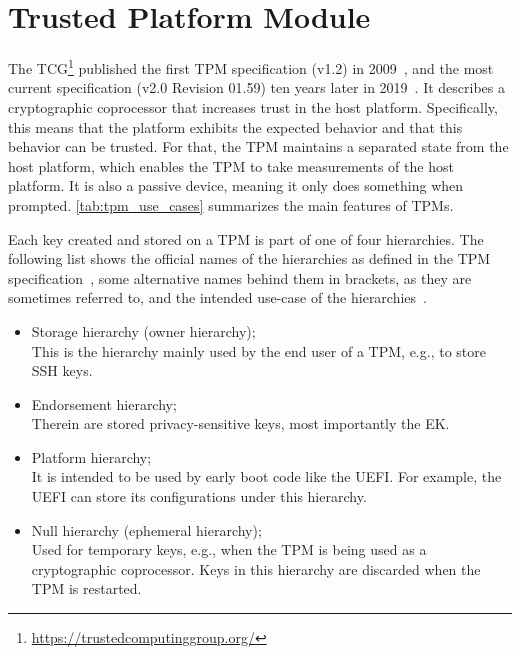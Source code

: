 \section{Trusted Platform Module}\label{sec:tpm}

The \ac{TCG}\footnote{\url{https://trustedcomputinggroup.org/}} published the first TPM specification (v1.2) in 2009~\cite{ISO11889}, and the most current specification (v2.0 Revision 01.59) ten years later in 2019~\cite{tpm}.
It describes a cryptographic coprocessor that increases trust in the host platform.
Specifically, this means that the platform exhibits the expected behavior and that this behavior can be trusted.
For that, the TPM maintains a separated state from the host platform, which enables the TPM to take measurements of the host platform.
It is also a passive device, meaning it only does something when prompted.
\autoref{tab:tpm_use_cases} summarizes the main features of TPMs.



Each key created and stored on a TPM is part of one of four hierarchies.
The following list shows the official names of the hierarchies as defined in the TPM specification~\cite{tpm}, some alternative names behind them in brackets, as they are sometimes referred to, and the intended use-case of the hierarchies~\cite{Arthur2015}.
\begin{itemize}

  \item{Storage hierarchy (owner hierarchy);\\
  This is the hierarchy mainly used by the end user of a TPM, e.g., to store SSH keys.}

  \item{Endorsement hierarchy;\\
  Therein are stored privacy-sensitive keys, most importantly the EK.}

  \item{Platform hierarchy;\\
  It is intended to be used by early boot code like the UEFI\@.
  For example, the UEFI can store its configurations under this hierarchy.}

  \item{Null hierarchy (ephemeral hierarchy);\\
  Used for temporary keys, e.g., when the TPM is being used as a cryptographic coprocessor.
  Keys in this hierarchy are discarded when the TPM is restarted.}

\end{itemize}

